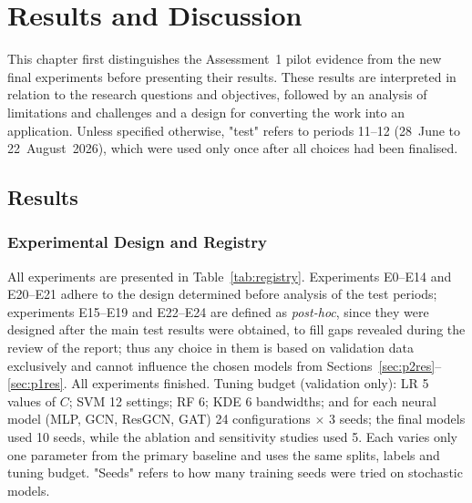 \documentclass[11pt,a4paper]{report}
\begin{document}
\chapter{Results and Discussion}
\label{ch:results}
This chapter first distinguishes the Assessment~1 pilot evidence from the new final experiments before presenting their results. These results are interpreted in relation to the research questions and objectives, followed by an analysis of limitations and challenges and a design for converting the work into an application. Unless specified otherwise, "test" refers to periods 11--12 (28~June to 22~August~2026), which were used only once after all choices had been finalised.

\section{Results}
\subsection{Experimental Design and Registry}
All experiments are presented in Table~\ref{tab:registry}. Experiments E0--E14 and E20--E21 adhere to the design determined before analysis of the test periods; experiments E15--E19 and E22--E24 are defined as \emph{post-hoc}, since they were designed after the main test results were obtained, to fill gaps revealed during the review of the report; thus any choice in them is based on validation data exclusively and cannot influence the chosen models from Sections~\ref{sec:p2res}--\ref{sec:p1res}. All experiments finished. Tuning budget (validation only): LR 5 values of $C$; SVM 12 settings; RF 6; KDE 6 bandwidths; and for each neural model (MLP, GCN, ResGCN, GAT) 24 configurations $\times$ 3 seeds; the final models used 10 seeds, while the ablation and sensitivity studies used 5. Each varies only one parameter from the primary baseline and uses the same splits, labels and tuning budget. "Seeds" refers to how many training seeds were tried on stochastic models.
\end{document}
